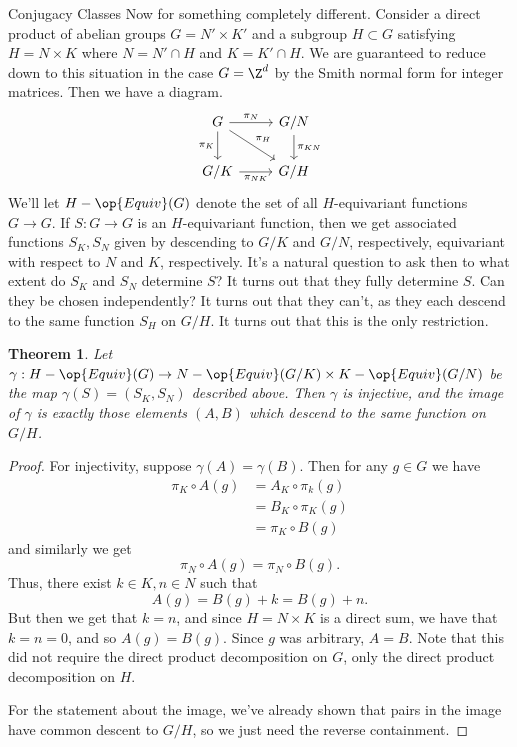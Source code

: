 \documentclass[12nt]{article}
\theoremstyle{plain}
\newtheorem{theorem}{Theorem}
\begin{document}
\begin{subsection}{Conjugacy Classes}
Now for something completely different. Consider a direct product of abelian groups $G = N' \times K'$ and a subgroup $H \subset G$ satisfying $H = N \times K$ where $N = N' \cap H$ and $K = K' \cap H$. We are guaranteed to reduce down to this situation in the case $G = \Z^d$ by the Smith normal form for integer matrices. Then we have a diagram.
\[
\begin{tikzcd}
G\ar[d, "\pi_K"'] \ar[dr, "\pi_H"] \ar[r, "\pi_N"] & G/N \ar[d, "\pi_{KN}"] \\
G/K \ar[r, "\pi_{NK}"'] & G/H
\end{tikzcd}
\]
We'll let $H-\op{Equiv}(G)$ denote the set of all $H$-equivariant functions $G \to G$. If $S : G \to G$ is an $H$-equivariant function, then we get associated functions $S_K, S_N$ given by descending to $G/K$ and $G/N$, respectively, equivariant with respect to $N$ and $K$, respectively. It's a natural question to ask then to what extent do $S_K$ and $S_N$ determine $S$? It turns out that they fully determine $S$. Can they be chosen independently? It turns out that they can't, as they each descend to the same function $S_H$ on $G/H$. It turns out that this is the only restriction.

\begin{theorem}
Let $\gamma : H-\op{Equiv}(G) \to N-\op{Equiv}(G/K) \times K-\op{Equiv}(G/N)$ be the map $\gamma(S) = (S_K, S_N)$ described above. Then $\gamma$ is injective, and the image of $\gamma$ is exactly those elements $(A, B)$ which descend to the same function on $G/H$.
\end{theorem}

\begin{proof}
For injectivity, suppose $\gamma(A) = \gamma(B)$. Then for any $g \in G$ we have
\begin{align*}
\pi_K \circ A(g) &= A_K \circ \pi_k(g) \\
	&= B_K \circ \pi_K(g) \\
	&= \pi_K \circ B(g)
\end{align*}
and similarly we get
\[
\pi_N \circ A(g) = \pi_N \circ B(g).
\]
Thus, there exist $k \in K, n \in N$ such that
\[
A(g) = B(g) + k = B(g) + n.
\]
But then we get that $k = n$, and since $H = N \times K$ is a direct sum, we have that $k = n = 0$, and so $A(g) = B(g)$. Since $g$ was arbitrary, $A = B$. Note that this did not require the direct product decomposition on $G$, only the direct product decomposition on $H$.

For the statement about the image, we've already shown that pairs in the image have common descent to $G/H$, so we just need the reverse containment.


\end{proof}
\end{subsection}
\end{document}
